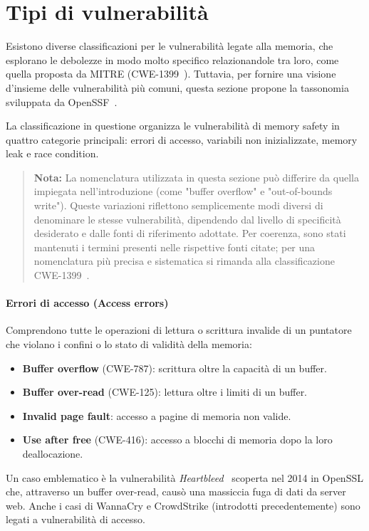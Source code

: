 \section{Tipi di vulnerabilità}
\label{sec:vulnerability_types}

Esistono diverse classificazioni per le vulnerabilità legate alla memoria, che
esplorano le debolezze in modo molto specifico relazionandole tra loro, come quella
proposta da MITRE (CWE-1399~\cite{cwe_1399}). Tuttavia, per fornire una visione d'insieme
delle vulnerabilità più comuni, questa sezione propone la tassonomia sviluppata da
OpenSSF~\cite{memory_safety_continuum_definition}.

La classificazione in questione organizza le vulnerabilità di memory safety in
quattro categorie principali: errori di accesso, variabili non inizializzate, memory
leak e race condition.

\begin{quote}
  \textbf{Nota:} La nomenclatura utilizzata in questa sezione può differire da
  quella impiegata nell'introduzione (come "buffer overflow" e "out-of-bounds
  write"). Queste variazioni riflettono semplicemente modi diversi di denominare
  le stesse vulnerabilità, dipendendo dal livello di specificità desiderato e
  dalle fonti di riferimento adottate. Per coerenza, sono stati mantenuti i
  termini presenti nelle rispettive fonti citate; per una nomenclatura più precisa
  e sistematica si rimanda alla classificazione CWE-1399~\cite{cwe_1399}.
\end{quote}

\paragraph{Errori di accesso (Access errors)}
\label{sec:access_errors}

Comprendono tutte le operazioni di lettura o scrittura invalide di un puntatore
che violano i confini o lo stato di validità della memoria:
\begin{itemize}
  \item \textbf{Buffer overflow} (CWE-787): scrittura oltre la capacità di un buffer.

  \item \textbf{Buffer over-read} (CWE-125): lettura oltre i limiti di un buffer.

  \item \textbf{Invalid page fault}: accesso a pagine di memoria non valide.

  \item \textbf{Use after free} (CWE-416): accesso a blocchi di memoria dopo la loro
    deallocazione.
\end{itemize}
Un caso emblematico è la vulnerabilità \textit{Heartbleed}~\cite{heartbleed} scoperta
nel 2014 in OpenSSL che, attraverso un buffer over-read, causò una massiccia fuga
di dati da server web. Anche i casi di WannaCry e CrowdStrike (introdotti precedentemente)
sono legati a vulnerabilità di accesso.

